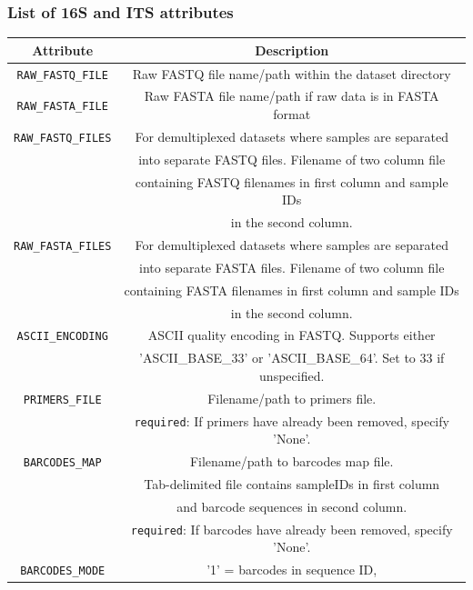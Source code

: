 \documentclass[11pt, oneside]{article}   	%
\begin{document}
\subsubsection{List of 16S and ITS attributes}
\begin{center}
\begin{longtable}{| c | c |}
    \hline
      \textbf{Attribute} & \textbf{Description} \\
      \hline
      {\tt RAW\_FASTQ\_FILE} & Raw FASTQ file name/path within the dataset directory \\
      \hline
      {\tt RAW\_FASTA\_FILE} & Raw FASTA file name/path if raw data is in FASTA format \\
      \hline
      {\tt RAW\_FASTQ\_FILES}
       & For demultiplexed datasets where samples are separated \\
       & into separate FASTQ files.  Filename of two column file \\
       & containing FASTQ filenames in first column and sample IDs \\
       & in the second column. \\
       \hline
      {\tt RAW\_FASTA\_FILES} 
       & For demultiplexed datasets where samples are separated \\
       & into separate FASTA files.  Filename of two column file \\
       & containing FASTA filenames in first column and sample IDs \\
       & in the second column. \\
       \hline
      {\tt ASCII\_ENCODING} & ASCII quality encoding in FASTQ.  Supports either \\
       & 'ASCII\_BASE\_33'  or 'ASCII\_BASE\_64'.  Set to 33 if unspecified. \\
       \hline
      {\tt PRIMERS\_FILE} & Filename/path to primers file. \\
       & {\tt required}: If primers have already been removed, specify 'None'. \\
       \hline
      {\tt BARCODES\_MAP} & Filename/path to barcodes map file. \\
       & Tab-delimited file contains sampleIDs in first column \\
       & and barcode sequences in second column. \\
       & {\tt required}: If barcodes have already been removed, specify 'None'. \\
       \hline
      {\tt BARCODES\_MODE} & '1' = barcodes in sequence ID, \\

\end{longtable}
\end{center}
\end{document}
